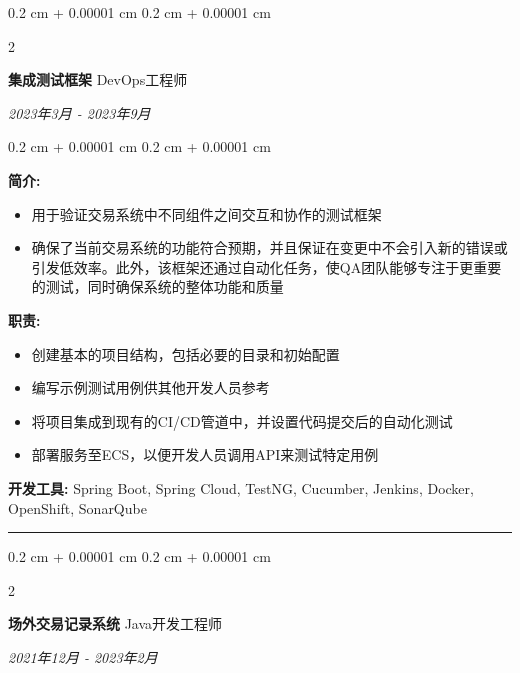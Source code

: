 \documentclass[10pt, letterpaper]{article}
\newenvironment{highlights}{
	\begin{itemize}[
		topsep=0.10 cm,
		parsep=0.10 cm,
		partopsep=0pt,
		itemsep=0pt,
		leftmargin=0.4 cm + 10pt
		]
	}{
	\end{itemize}
} %
\newenvironment{onecolentry}{
	\begin{adjustwidth}{
			0.2 cm + 0.00001 cm
		}{
			0.2 cm + 0.00001 cm
		}
	}{
	\end{adjustwidth}
} %
\newenvironment{twocolentry}[2][]{
	\onecolentry
	\def\secondColumn{#2}
	\setcolumnwidth{\fill, 4.5 cm}
	\begin{paracol}{2}
	}{
		\switchcolumn \raggedleft \secondColumn
	\end{paracol}
	\endonecolentry
} %
\begin{document}
			\vspace{0.4 cm}
			\begin{twocolentry}{	
				\textit{2023年3月 - 2023年9月}}
				\textbf{集成测试框架}
				\space\space\space\space\space\space\space\space\space\space\space\space DevOps工程师
			\end{twocolentry}
			
			\vspace{0.10 cm}
			\begin{onecolentry}
				\textbf{简介:} 
				\begin{highlights}
					\item {用于验证交易系统中不同组件之间交互和协作的测试框架}
					\item {确保了当前交易系统的功能符合预期，并且保证在变更中不会引入新的错误或引发低效率。此外，该框架还通过自动化任务，使QA团队能够专注于更重要的测试，同时确保系统的整体功能和质量}
				\end{highlights}
				\textbf{职责:} 
				\begin{highlights}
					\item {创建基本的项目结构，包括必要的目录和初始配置}
					\item {编写示例测试用例供其他开发人员参考}
					\item {将项目集成到现有的CI/CD管道中，并设置代码提交后的自动化测试}
					\item {部署服务至ECS，以便开发人员调用API来测试特定用例}
				\end{highlights}
				\textbf{开发工具:} Spring Boot, Spring Cloud, TestNG, Cucumber, Jenkins, Docker, OpenShift, SonarQube
			\end{onecolentry}
			\vspace{0.4 cm}
			\hrule
			\vspace{0.4 cm}
			\begin{twocolentry}{	
				\textit{2021年12月 - 2023年2月}}
				\textbf{场外交易记录系统}
				\space\space\space\space\space\space\space\space\space\space\space\space Java开发工程师
			\end{twocolentry}
			
\end{document}
